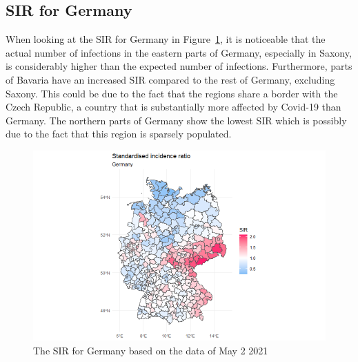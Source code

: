 \subsection{SIR for Germany}
When looking at the SIR for Germany in Figure~\ref{sirgermany}, it is noticeable that the actual number of infections in the eastern parts of Germany, especially in Saxony, is considerably higher than the expected number of infections. Furthermore, parts of Bavaria have an increased SIR compared to the rest of Germany, excluding Saxony. This could be due to the fact that the regions share a border with the Czech Republic, a country that is substantially more affected by Covid-19 than Germany. The northern parts of Germany show the lowest SIR which is possibly due to the fact that this region is sparsely populated.
\begin{figure}[H]
 \centering
 \includegraphics[width = 1.2\textwidth]{sir_germany.png}
 \caption{The SIR for Germany based on the data of May 2 2021}
 \label{sirgermany}
\end{figure}
